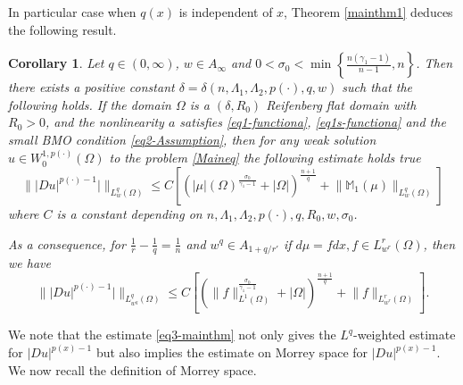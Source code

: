\documentclass[a4paper,10pt]{amsart}
\newtheorem{cor}[thm]{Corollary}
\newcommand{\Mu}{\mathbb{M}_1(\mu)}
\newcommand{\pd}{p(\cdot)}
\newcommand{\f}{\frac}
\newcommand{\Om}{\Omega}
\newcommand{\vc}{\infty}
\begin{document}
In particular case when $q(x)$ is independent of $x$, Theorem \ref{mainthm1} deduces the following result.
\begin{cor}\label{mainthm3}
	Let $q\in (0,\vc)$, $w\in A_{\vc}$ and $0<\sigma_0<\min\left\{\f{n(\gamma_1-1)}{n-1},n\right\}$. Then there
	exists  a positive constant $\delta=\delta(n,\Lambda_1, \Lambda_2, \pd,q,w)$ such that the following holds. If the domain $\Omega$ is a $(\delta, R_0)$ Reifenberg flat domain with $ R_0>0$, and the nonlinearity $a$ satisfies \eqref{eq1-functiona}, \eqref{eq1s-functiona} and the small BMO condition \eqref{eq2-Assumption}, then for any weak solution $u\in W^{1,\pd}_0(\Om)$ to the problem \eqref{Maineq} the following estimate holds true
	\begin{equation}\label{eq3-mainthm}
	\Big\||Du|^{p(\cdot)-1}|\Big\|_{L^q_w(\Om)} \leq C\left[(|\mu|(\Om)^{\f{\sigma_0}{\gamma_1-1}}+|\Om|)^{\f{n+1}{q}} + \Big\|\Mu\Big\|_{L^q_w(\Om)}\right]
	\end{equation}
	where $C$ is a constant depending on $n,\Lambda_1, \Lambda_2, \pd, q, R_0,w, \sigma_0$.
	
	As a consequence, for $\f{1}{r}-\f{1}{q}=\f{1}{n}$ and $w^q\in A_{1+q/r'}$  if $d\mu=fdx, f \in L^r_{w^r}(\Om)$, then  we have
	\begin{equation}\label{eq3s-mainthm}
	\Big\||Du|^{p(\cdot)-1}|\Big\|_{L^q_{w^q}(\Om)} \leq C\left[(\|f\|_{L^1(\Om)}^{\f{\sigma_0}{\gamma_1-1}}+|\Om|)^{\f{n+1}{q}} + \Big\|f\Big\|_{L^r_{w^r}(\Om)}\right].
	\end{equation}
\end{cor}

We note that the estimate \eqref{eq3-mainthm} not only gives the $L^q$-weighted estimate for $|Du|^{p(x)-1}$ but also implies the  
estimate on Morrey space for $|Du|^{p(x)-1}$. We now recall the definition of Morrey space. 
\end{document}
